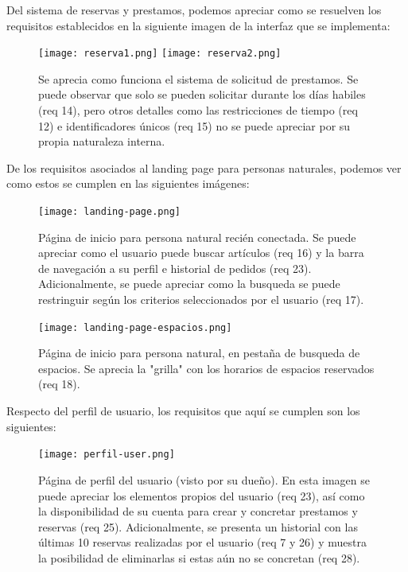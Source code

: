Del sistema de reservas y prestamos, podemos apreciar como se resuelven los requisitos establecidos en la siguiente imagen de la interfaz que se implementa: \\

\begin{figure}[H]
\texttt{[image: reserva1.png]}
\texttt{[image: reserva2.png]}
\caption{Se aprecia como funciona el sistema de solicitud de prestamos. Se puede observar que solo se pueden solicitar durante los días habiles (req 14), pero otros detalles como las restricciones de tiempo (req 12) e identificadores únicos (req 15) no se puede apreciar por su propia naturaleza interna.} 
\label{Solicitar}
\end{figure}

De los requisitos asociados al landing page para personas naturales, podemos ver como estos se cumplen en las siguientes imágenes:


\begin{figure}[H]
\texttt{[image: landing-page.png]}
\caption{Página de inicio para persona natural recién conectada. Se puede apreciar como el usuario puede buscar artículos (req 16) y la barra de navegación a su perfil e historial de pedidos (req 23). Adicionalmente, se puede apreciar como la busqueda se puede restringuir según los criterios seleccionados por el usuario (req 17).} 
\label{LPUsers}
\end{figure}

\begin{figure}[H]
\texttt{[image: landing-page-espacios.png]}
\caption{Página de inicio para persona natural, en pestaña de busqueda de espacios. Se aprecia la "grilla" con los horarios de espacios reservados (req 18).} 
\label{LPUsersEspacios}
\end{figure}

Respecto del perfil de usuario, los requisitos que aquí se cumplen son los siguientes:


\begin{figure}[H]
\texttt{[image: perfil-user.png]}
\caption{Página de perfil del usuario (visto por su dueño). En esta imagen se puede apreciar los elementos propios del usuario (req 23), así como la disponibilidad de su cuenta para crear y concretar prestamos y reservas (req 25). Adicionalmente, se presenta un historial con las últimas 10 reservas realizadas por el usuario (req 7 y 26) y muestra la posibilidad de eliminarlas si estas aún no se concretan (req 28).} 
\label{LPUsersEspacios}
\end{figure}


